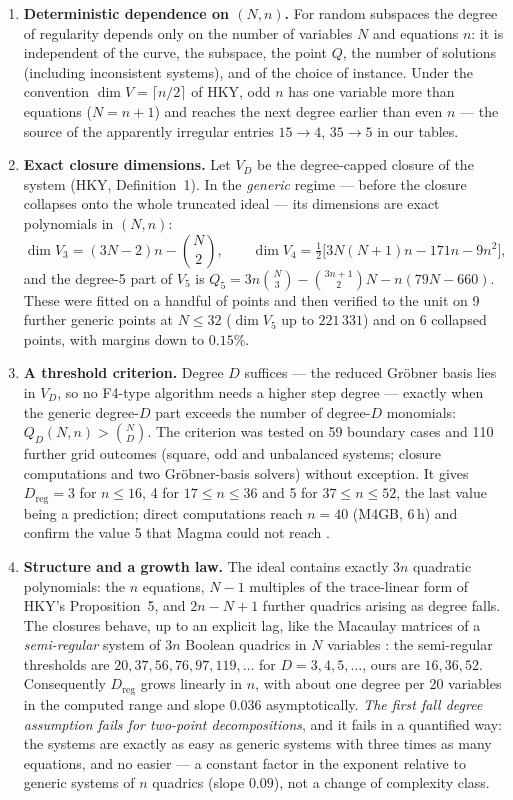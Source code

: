 \documentclass[11pt,a4paper]{article}
\theoremstyle{remark}\newtheorem{remark}{Remark}
\newcommand{\Dreg}{D_{\mathrm{reg}}}
\begin{document}
\begin{enumerate}
\item \textbf{Deterministic dependence on $(N,n)$.} For random subspaces the degree of regularity depends only on the number of variables $N$ and equations $n$: it is independent of the curve, the subspace, the point $Q$, the number of solutions (including inconsistent systems), and of the choice of instance. Under the convention $\dim V=\lceil n/2\rceil$ of HKY, odd $n$ has one variable more than equations ($N=n+1$) and reaches the next degree earlier than even $n$ --- the source of the apparently irregular entries $15\to4$, $35\to5$ in our tables.

\item \textbf{Exact closure dimensions.} Let $V_D$ be the degree-capped closure of the system (HKY, Definition~1). In the \emph{generic} regime --- before the closure collapses onto the whole truncated ideal --- its dimensions are exact polynomials in $(N,n)$:
\[
\dim V_3=(3N-2)n-\binom N2,\qquad \dim V_4=\tfrac12\bigl[3N(N+1)n-171n-9n^2\bigr],
\]
and the degree-5 part of $V_5$ is $Q_5=3n\binom N3-\binom{3n+1}2N-n(79N-660)$. These were fitted on a handful of points and then verified to the unit on 9 further generic points at $N\le32$ ($\dim V_5$ up to $221\,331$) and on 6 collapsed points, with margins down to $0.15\%$.

\item \textbf{A threshold criterion.} Degree $D$ suffices --- the reduced Gröbner basis lies in $V_D$, so no F4-type algorithm needs a higher step degree --- exactly when the generic degree-$D$ part exceeds the number of degree-$D$ monomials: $Q_D(N,n)>\binom ND$. The criterion was tested on 59 boundary cases and 110 further grid outcomes (square, odd and unbalanced systems; closure computations and two Gröbner-basis solvers) without exception. It gives $\Dreg=3$ for $n\le16$, 4 for $17\le n\le36$ and 5 for $37\le n\le52$, the last value being a prediction; direct computations reach $n=40$ (M4GB, 6\,h) and confirm the value 5 that Magma could not reach \cite{KY15}.

\item \textbf{Structure and a growth law.} The ideal contains exactly $3n$ quadratic polynomials: the $n$ equations, $N-1$ multiples of the trace-linear form of HKY's Proposition~5, and $2n-N+1$ further quadrics arising as degree falls. The closures behave, up to an explicit lag, like the Macaulay matrices of a \emph{semi-regular} system of $3n$ Boolean quadrics in $N$ variables \cite{BFS03,BFSY05}: the semi-regular thresholds are $20,37,56,76,97,119,\dots$ for $D=3,4,5,\dots$, ours are $16,36,52$. Consequently $\Dreg$ grows linearly in $n$, with about one degree per 20 variables in the computed range and slope $0.036$ asymptotically. \emph{The first fall degree assumption fails for two-point decompositions}, and it fails in a quantified way: the systems are exactly as easy as generic systems with three times as many equations, and no easier --- a constant factor in the exponent relative to generic systems of $n$ quadrics (slope $0.09$), not a change of complexity class.


\end{enumerate}
\end{document}
